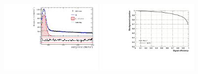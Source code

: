 \begin{figure}[h]
\centering
\includegraphics[height=!,width=0.45\textwidth]{figs/MassFit/norm_preselected_pull.pdf}
\includegraphics[height=!,width=0.45\textwidth]{figs/TMVA/BDTG_Data_run1_t0_even/rejBvsS.pdf}
\caption{}
\label{fig:}
\end{figure}


